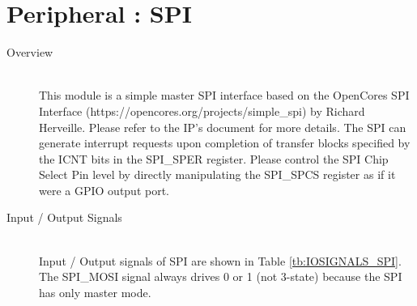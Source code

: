 \section{Peripheral : SPI}

\begin{description}

    \item[Overview]\mbox{}\\
        This module is a simple master SPI interface based on the OpenCores SPI Interface (https://opencores.org/projects/simple\_spi) by Richard Herveille. Please refer to the IP’s document for more details. The SPI can generate interrupt requests upon completion of transfer blocks specified by the ICNT bits in the SPI\_SPER register. Please control the SPI Chip Select Pin level by directly manipulating the SPI\_SPCS register as if it were a GPIO output port.

    \item[Input / Output Signals]\mbox{}\\
        Input / Output signals of SPI are shown in Table \ref{tb:IOSIGNALS_SPI}. The SPI\_MOSI signal always drives 0 or 1 (not 3-state) because the SPI has only master mode.


\end{description}
